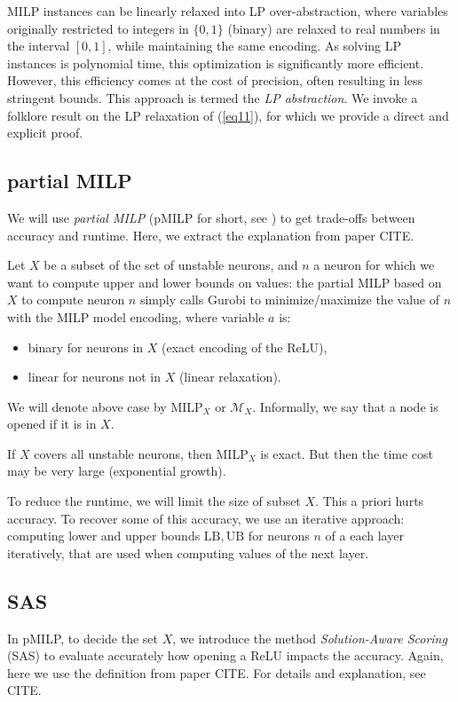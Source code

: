 \documentclass{llncs}
\newcommand{\UB}{\mathrm{UB}}
\newcommand{\LB}{\mathrm{LB}}
\begin{document}
	MILP instances can be linearly relaxed into LP over-abstraction, where variables originally restricted to integers in $\{0,1\}$ (binary) are relaxed to real numbers in the interval $[0,1]$, while maintaining the same encoding. As solving LP instances is polynomial time, this optimization is significantly more efficient. However, this efficiency comes at the cost of precision, often resulting in less stringent bounds. This approach is termed the {\em LP abstraction}. We invoke a folklore result on the LP relaxation of (\ref{eq11}), for which we provide a direct and explicit proof.
	
	
	\subsection{partial MILP}
	
	We will use {\em partial MILP} (pMILP for short, see \cite{DivideAndSlide}) to get trade-offs between accuracy and runtime. Here, we extract the explanation from paper CITE.
	
	
	Let $X$ be a subset of the set of unstable neurons, and $n$ a neuron for which we want to compute upper and lower bounds on values: the partial MILP based on $X$ to compute neuron $n$ simply calls Gurobi to minimize/maximize the value of $n$ with the MILP model encoding, where variable $a$ is:
	\begin{itemize}
		\item binary for neurons in $X$ (exact encoding of the ReLU),
		\item linear for neurons not in $X$ (linear relaxation).
	\end{itemize}
	We will denote above case by MILP$_X$ or $\mathcal{M}_X$. Informally, we say that a node is opened if it is in $X$. 
	
	If $X$ covers all unstable neurons, then MILP$_X$ is exact. But then the time cost may be very large (exponential growth).
	
	
	To reduce the runtime, we will limit the size of subset $X$. This a priori hurts accuracy. To recover some of this accuracy, we use an iterative approach: computing lower and upper bounds $\LB,\UB$ for neurons $n$ of a each layer iteratively, that are used when computing values of the next layer.
	
	
	\subsection{SAS}
	
	
	In pMILP, to decide the set $X$, we introduce the method {\em Solution-Aware Scoring} (SAS)
	to evaluate accurately how opening a ReLU impacts the accuracy. Again, here we use the definition from paper CITE. For details and explanation, see CITE.
	
\end{document}
